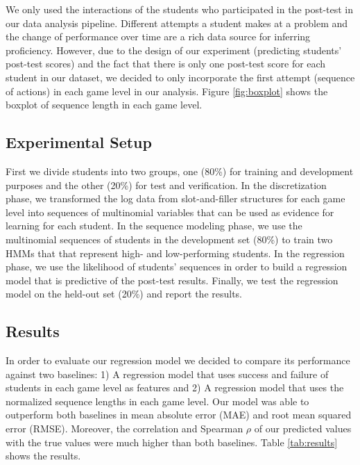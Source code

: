 \documentclass{sigchi}
\begin{document}
	We only used the interactions of the students who participated in the post-test in our data analysis pipeline.
	Different attempts a student makes at a problem and the change of performance over time are a rich data source for inferring proficiency.
	However, due to the design of our experiment (predicting students' post-test scores) and the fact that there is only one post-test score for each student in our dataset, we decided to  only incorporate the first attempt (sequence of actions) in each game level in our analysis. Figure \ref{fig:boxplot} shows the boxplot of sequence length in each game level. 
	
	\subsection{Experimental Setup}
	First we divide students into two groups, one (80\%) for training and development purposes and the other (20\%) for test and verification.
	In the discretization phase, we transformed the log data from slot-and-filler structures for each game level into sequences of multinomial variables that can be used as evidence for learning for each student.
	In the sequence modeling phase, we use the multinomial sequences of students in the development set (80\%) to train two HMMs that that represent high- and low-performing students.
	In the regression phase, we use the likelihood of students' sequences in order to build a regression model that is predictive of the post-test results.
	Finally, we test the regression model on the held-out set (20\%) and report the results.
	
	\subsection{Results}
	
	In order to evaluate our regression model we decided to compare its performance against two baselines: 1) A regression model that uses success and failure of students in each game level as features and 2) A regression model that uses the normalized sequence lengths in each game level. 
	Our model was able to outperform both baselines in mean absolute error (MAE) and root mean squared error (RMSE). 
	Moreover, the correlation and Spearman $\rho$ of our predicted values with the true values were much higher than both baselines. 
	Table \ref{tab:results} shows the results.
	
\end{document}
